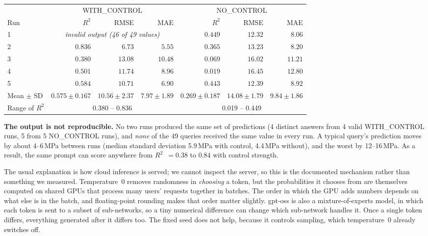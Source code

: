 \documentclass[11pt]{article}
\newcommand{\R}{$R^2$}
\begin{document}
\begin{center}\small
\begin{tabular}{lrrrrrr}
\toprule
& \multicolumn{3}{c}{WITH\_CONTROL} & \multicolumn{3}{c}{NO\_CONTROL} \\
\cmidrule(lr){2-4}\cmidrule(lr){5-7}
Run & \R{} & RMSE & MAE & \R{} & RMSE & MAE \\
\midrule
1 & \multicolumn{3}{c}{\emph{invalid output (46 of 49 values)}} & $0.449$ & $12.32$ & $8.06$ \\
2 & $0.836$ & $6.73$ & $5.55$ & $0.365$ & $13.23$ & $8.20$ \\
3 & $0.380$ & $13.08$ & $10.48$ & $0.069$ & $16.02$ & $11.21$ \\
4 & $0.501$ & $11.74$ & $8.96$ & $0.019$ & $16.45$ & $12.80$ \\
5 & $0.584$ & $10.71$ & $6.90$ & $0.443$ & $12.39$ & $8.92$ \\
\midrule
Mean $\pm$ SD & $\mathbf{0.575\pm0.167}$ & $10.56\pm2.37$ & $7.97\pm1.89$
              & $\mathbf{0.269\pm0.187}$ & $14.08\pm1.79$ & $9.84\pm1.86$ \\
Range of \R{} & \multicolumn{3}{c}{0.380 -- 0.836} & \multicolumn{3}{c}{0.019 -- 0.449} \\
\bottomrule
\end{tabular}
\end{center}

\noindent \textbf{The output is not reproducible.} No two runs produced the same set of
predictions (4 distinct answers from 4 valid WITH\_CONTROL runs, 5 from 5 NO\_CONTROL
runs), and \emph{none} of the 49 queries received the same value in every run. A typical
query's prediction moves by about 4--6\,MPa between runs (median standard deviation
5.9\,MPa with control, 4.4\,MPa without), and the worst by 12--16\,MPa. As a result, the
same prompt can score anywhere from \R{}~$=0.38$ to $0.84$ with control strength.

The usual explanation is how cloud inference is served; we cannot inspect the server,
so this is the documented mechanism rather than something we measured. Temperature~0
removes randomness in \emph{choosing} a token, but the probabilities it chooses from are
themselves computed on shared GPUs that process many users' requests together in
batches. The order in which the GPU adds numbers depends on what else is in the batch,
and floating-point rounding makes that order matter slightly. gpt-oss is also a
mixture-of-experts model, in which each token is sent to a subset of sub-networks, so a
tiny numerical difference can change which sub-network handles it. Once a single token
differs, everything generated after it differs too. The fixed seed does not help,
because it controls sampling, which temperature~0 already switches off.
\end{document}
